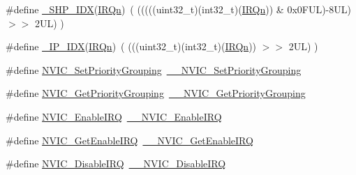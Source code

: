 \begin{DoxyCompactItemize}
\item 
\#define \mbox{\hyperlink{group___c_m_s_i_s___core___n_v_i_c_functions_gaee4f7eb5d7e770ad51489dbceabb1755}{\+\_\+\+S\+H\+P\+\_\+\+I\+DX}}(\mbox{\hyperlink{group___interrupt__vector__numbers_ga666eb0caeb12ec0e281415592ae89083}{I\+R\+Qn}})~( (((((uint32\+\_\+t)(int32\+\_\+t)(\mbox{\hyperlink{group___interrupt__vector__numbers_ga666eb0caeb12ec0e281415592ae89083}{I\+R\+Qn}})) \& 0x0\+F\+U\+L)-\/8\+U\+L) $>$$>$    2\+U\+L)      )
\item 
\#define \mbox{\hyperlink{group___c_m_s_i_s___core___n_v_i_c_functions_ga370ec4b1751a6a889d849747df3763a9}{\+\_\+\+I\+P\+\_\+\+I\+DX}}(\mbox{\hyperlink{group___interrupt__vector__numbers_ga666eb0caeb12ec0e281415592ae89083}{I\+R\+Qn}})~(   (((uint32\+\_\+t)(int32\+\_\+t)(\mbox{\hyperlink{group___interrupt__vector__numbers_ga666eb0caeb12ec0e281415592ae89083}{I\+R\+Qn}}))                $>$$>$    2\+U\+L)      )
\item 
\#define \mbox{\hyperlink{group___c_m_s_i_s___core___n_v_i_c_functions_ga0e798d5aec68cdd8263db86a76df788f}{N\+V\+I\+C\+\_\+\+Set\+Priority\+Grouping}}~\mbox{\hyperlink{group___c_m_s_i_s___core___n_v_i_c_functions_gafc94dcbaee03e4746ade1f5bb9aaa56d}{\+\_\+\+\_\+\+N\+V\+I\+C\+\_\+\+Set\+Priority\+Grouping}}
\item 
\#define \mbox{\hyperlink{group___c_m_s_i_s___core___n_v_i_c_functions_ga4eeb9214f2264fc23c34ad5de2d3fa11}{N\+V\+I\+C\+\_\+\+Get\+Priority\+Grouping}}~\mbox{\hyperlink{group___c_m_s_i_s___core___n_v_i_c_functions_ga9b894af672df4373eb637f8288845c05}{\+\_\+\+\_\+\+N\+V\+I\+C\+\_\+\+Get\+Priority\+Grouping}}
\item 
\#define \mbox{\hyperlink{group___c_m_s_i_s___core___n_v_i_c_functions_ga57b3064413dbc7459d9646020fdd8bef}{N\+V\+I\+C\+\_\+\+Enable\+I\+RQ}}~\mbox{\hyperlink{group___c_m_s_i_s___core___n_v_i_c_functions_ga71227e1376cde11eda03fcb62f1b33ea}{\+\_\+\+\_\+\+N\+V\+I\+C\+\_\+\+Enable\+I\+RQ}}
\item 
\#define \mbox{\hyperlink{group___c_m_s_i_s___core___n_v_i_c_functions_ga857de13232ec65dd15087eaa15bc4a69}{N\+V\+I\+C\+\_\+\+Get\+Enable\+I\+RQ}}~\mbox{\hyperlink{group___c_m_s_i_s___core___n_v_i_c_functions_gaaeb5e7cc0eaad4e2817272e7bf742083}{\+\_\+\+\_\+\+N\+V\+I\+C\+\_\+\+Get\+Enable\+I\+RQ}}
\item 
\#define \mbox{\hyperlink{group___c_m_s_i_s___core___n_v_i_c_functions_ga73b4e251f59cab4e9a5e234aac02ae57}{N\+V\+I\+C\+\_\+\+Disable\+I\+RQ}}~\mbox{\hyperlink{group___c_m_s_i_s___core___n_v_i_c_functions_gae016e4c1986312044ee768806537d52f}{\+\_\+\+\_\+\+N\+V\+I\+C\+\_\+\+Disable\+I\+RQ}}

\end{DoxyCompactItemize}
